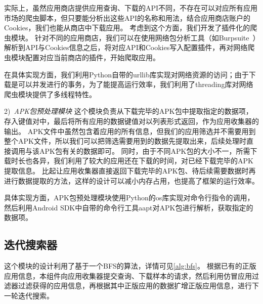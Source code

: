实际上，虽然应用商店提供应用查询、下载的API不同，不存在可以对应所有应用市场的爬虫脚本，但只要能分析出这些API的名称和用法，结合应用商店账户的Cookies，我们也能从商店中下载应用。
考虑到这个方面，我们开发了插件化的爬虫模块。
针对不同的应用商店，我们可以在使用网络包分析工具（如Burpsuite~\cite{burpsuite}）解析到API与Cookies信息之后，将对应API和Cookies写入配置插件，再对网络爬虫模块配置对应当前商店的插件，开始爬取应用。

在具体实现方面，我们利用Python自带的urllib库实现对网络资源的访问；由于下载是可以并发进行的事务，为了能提高运行效率，我们利用了threading库对网络爬虫模块提供了多线程特性。

2)\ \emph{APK包预处理模块} \quad
这个模块负责从下载完毕的APK包中提取指定的数据项，存入键值对中，最后将所有应用的数据键值对以列表形式返回，作为应用收集器的输出。
APK文件中虽然包含着应用的所有信息，但我们的应用筛选并不需要用到整个APK文件，所以我们可以把筛选需要用到的数据先提取出来，后续处理时直接调用与该APK包有关的数据即可。
同时，由于不同APK包的大小不一，所需下载时长也各异，我们利用了较大的应用还在下载的时间，对已经下载完毕的APK提取信息。
比起让应用收集器直接返回下载完毕的APK包、待后续需要数据时再进行数据提取的方法，这样的设计可以减小内存占用，也提高了框架的运行效率。

具体实现方面，APK包预处理模块使用Python的os库实现对命令行指令的调用，然后利用Android SDK中自带的命令行工具aapt对APK包进行解析，获取指定的数据项。


\subsection{迭代搜索器}
这个模块的设计利用了基于一个BFS的算法，详情可见\autoref{alg:bfs}。
根据已有的正版应用信息，本组件向应用收集器提交查询、下载样本的请求，然后利用仿冒应用过滤器过滤获得的应用信息，再根据其中正版应用的数据扩增正版应用信息，进行下一轮迭代搜索。

